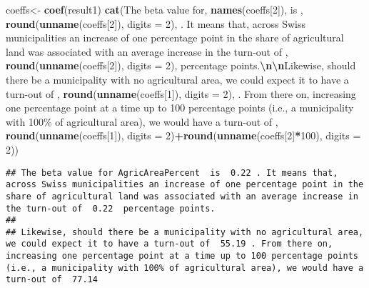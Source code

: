 \documentclass[
]{book}
\newenvironment{Shaded}{\begin{snugshade}}{\end{snugshade}}
\newcommand{\AttributeTok}[1]{\textcolor[rgb]{0.13,0.29,0.53}{#1}}
\newcommand{\DecValTok}[1]{\textcolor[rgb]{0.00,0.00,0.81}{#1}}
\newcommand{\FunctionTok}[1]{\textcolor[rgb]{0.13,0.29,0.53}{\textbf{#1}}}
\newcommand{\NormalTok}[1]{#1}
\newcommand{\OtherTok}[1]{\textcolor[rgb]{0.56,0.35,0.01}{#1}}
\newcommand{\SpecialCharTok}[1]{\textcolor[rgb]{0.81,0.36,0.00}{\textbf{#1}}}
\newcommand{\StringTok}[1]{\textcolor[rgb]{0.31,0.60,0.02}{#1}}
\begin{document}
\begin{Shaded}
\begin{Highlighting}[]
\NormalTok{coeffs}\OtherTok{\textless{}{-}} \FunctionTok{coef}\NormalTok{(result1)}
\FunctionTok{cat}\NormalTok{(}\StringTok{\textquotesingle{}The beta value for\textquotesingle{}}\NormalTok{, }\FunctionTok{names}\NormalTok{(coeffs[}\DecValTok{2}\NormalTok{]), }\StringTok{\textquotesingle{} is \textquotesingle{}}\NormalTok{, }\FunctionTok{round}\NormalTok{(}\FunctionTok{unname}\NormalTok{(coeffs[}\DecValTok{2}\NormalTok{]), }\AttributeTok{digits =} \DecValTok{2}\NormalTok{), }\StringTok{\textquotesingle{}. It means that, across Swiss municipalities an increase of one percentage point in the share of agricultural land was associated with an average increase in the turn{-}out of \textquotesingle{}}\NormalTok{, }\FunctionTok{round}\NormalTok{(}\FunctionTok{unname}\NormalTok{(coeffs[}\DecValTok{2}\NormalTok{]), }\AttributeTok{digits =} \DecValTok{2}\NormalTok{), }\StringTok{\textquotesingle{} percentage points.}\SpecialCharTok{\textbackslash{}n\textbackslash{}n}\StringTok{Likewise, should there be a municipality with no agricultural area, we could expect it to have a turn{-}out of \textquotesingle{}}\NormalTok{, }\FunctionTok{round}\NormalTok{(}\FunctionTok{unname}\NormalTok{(coeffs[}\DecValTok{1}\NormalTok{]), }\AttributeTok{digits =} \DecValTok{2}\NormalTok{), }\StringTok{\textquotesingle{}. From there on, increasing one percentage point at a time up to 100 percentage points (i.e., a municipality with 100\% of agricultural area), we would have a turn{-}out of \textquotesingle{}}\NormalTok{, }\FunctionTok{round}\NormalTok{(}\FunctionTok{unname}\NormalTok{(coeffs[}\DecValTok{1}\NormalTok{]), }\AttributeTok{digits =} \DecValTok{2}\NormalTok{)}\SpecialCharTok{+}\FunctionTok{round}\NormalTok{(}\FunctionTok{unname}\NormalTok{(coeffs[}\DecValTok{2}\NormalTok{]}\SpecialCharTok{*}\DecValTok{100}\NormalTok{), }\AttributeTok{digits =} \DecValTok{2}\NormalTok{))}
\end{Highlighting}
\end{Shaded}

\begin{verbatim}
## The beta value for AgricAreaPercent  is  0.22 . It means that, across Swiss municipalities an increase of one percentage point in the share of agricultural land was associated with an average increase in the turn-out of  0.22  percentage points.
## 
## Likewise, should there be a municipality with no agricultural area, we could expect it to have a turn-out of  55.19 . From there on, increasing one percentage point at a time up to 100 percentage points (i.e., a municipality with 100% of agricultural area), we would have a turn-out of  77.14
\end{verbatim}
\end{document}
